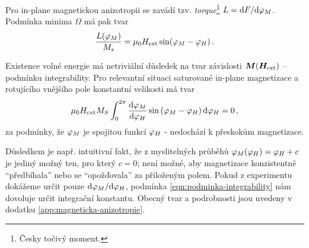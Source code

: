 Pro in-plane magnetickou anizotropii se zavádí tzv. \emph{torque}\footnote{Česky točivý moment.} $L=\textrm{d}F/\textrm{d}\varphi_M$.
Podmínka minima $\Omega$ má pak tvar
\begin{equation}
    \frac{L(\varphi_M)}{M_s} = \mu_0H_\textrm{ext} \sin (\varphi_M-\varphi_H) \,.
\end{equation}

Existence volné energie má netriviální důsledek na tvar závislosti $\bm{M}(\bm{H}_\textrm{ext})$ -- podmínku integrability.
Pro relevantní situaci saturované in-plane magnetizace a rotujícího vnějšího pole konstantní velikosti má tvar
\begin{equation}
\label{eqn:podminka-integrability}
    \mu_0H_\textrm{ext} M_S \int_{0}^{2\pi}  \frac{\text{d}\varphi_M}{\text{d}\varphi_H} \sin\left(\varphi_M-\varphi_H\right) \text{d}\varphi_H=0 \,,
\end{equation}
za podmínky, že $\varphi_M$ je spojitou funkcí $\varphi_H$ - nedochází k přeskokům magnetizace.

Důsledkem je např. intuitivní fakt, že z myslitelných průběhů $\varphi_M(\varphi_H)=\varphi_H+c$ je jediný možný ten, pro který $c=0$;
není možné, aby magnetizace konzistentně ``předbíhala'' nebo se ``opožďovala'' za přiloženým polem.
Pokud z experimentu dokážeme určit pouze $\text{d}\varphi_M/\text{d}\varphi_H$, podmínka \eqref{eqn:podminka-integrability} nám dovoluje určit integrační konstantu.
Obecný tvar a podrobnosti jsou uvedeny v dodatku \ref{app:magneticka-anizotropie}.
